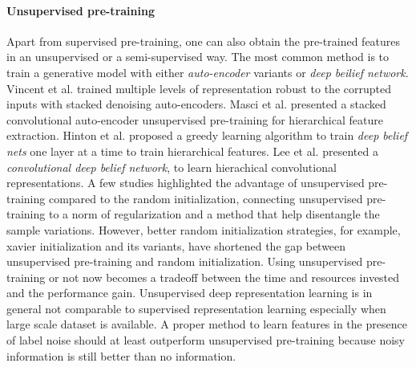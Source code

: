 \paragraph{Unsupervised pre-training}
Apart from supervised pre-training, one can also obtain the pre-trained features in an unsupervised or a semi-supervised way.
The most common method is to train a generative model with either \textit{auto-encoder} variants or \textit{deep beilief network}.
Vincent et al.\cite{vincent2010stacked} trained multiple levels of representation robust to the corrupted inputs with stacked denoising auto-encoders.
Masci et al.\cite{masci2011stacked} presented a stacked convolutional auto-encoder unsupervised pre-training for hierarchical feature extraction.
Hinton et al.\cite{hinton2006fast} proposed a greedy learning algorithm to train \textit{deep belief nets} one layer at a time to train hierarchical features.
Lee et al.\cite{lee2009convolutional} presented a \textit{convolutional deep belief network}, to learn hierachical convolutional representations.
A few studies\cite{erhan2009difficulty,erhan2010does,bengio2012deep} highlighted the advantage of unsupervised pre-training compared to the random initialization, connecting unsupervised pre-training to a norm of regularization and a method that help disentangle the sample variations.
However, better random initialization strategies, for example, xavier initialization\cite{glorot2010understanding} and its variants, have shortened the gap between unsupervised pre-training and random initialization.
Using unsupervised pre-training or not now becomes a tradeoff between the time and resources invested and the performance gain.
Unsupervised deep representation learning is in general not comparable to supervised representation learning especially when large scale dataset is available.
A proper method to learn features in the presence of label noise should at least outperform  unsupervised pre-training because noisy information is still better than no information.

